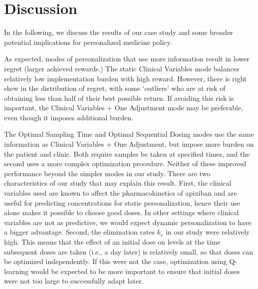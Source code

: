  \section{Discussion}\label{ss:discussion}


In the following, we discuss the results of our case study and some broader potential implications for personalized medicine policy.


As expected, modes of personalization that use more information result in lower regret (larger achieved rewards.)  The static Clinical Variables mode balances relatively low implementation burden with high reward. However, there is right skew in the distribution of regret, with some `outliers' who are at risk of obtaining less than half of their best possible return. If avoiding this risk is important, the Clinical Variables + One Adjustment mode may be preferable, even though it imposes additional burden. 

The Optimal Sampling Time and Optimal Sequential Dosing modes use the same information as Clinical Variables + One Adjustment, but impose more burden on the patient and clinic. Both require samples be taken at specified times, and the second uses a more complex optimization procedure. Neither of these improved performance beyond the simpler modes in our study. There are two characteristics of our study that may explain this result. First, the clinical variables used are known to affect the pharmacokinetics of apixiban and are useful for predicting concentrations for static personalization, hence their use alone makes it possible to choose good doses. In other settings where clinical variables are not as predictive, we would expect dynamic personalization to have a bigger advantage. Second, the elimination rates $k_e$ in our study were relatively high. This means that the effect of an initial dose on levels at the time subsequent doses are taken (i.e., a day later) is relatively small, so that doses can be optimized independently. If this were not the case, optimization using Q-learning would be expected to be more important to ensure that initial doses were not too large to successfully adapt later.

